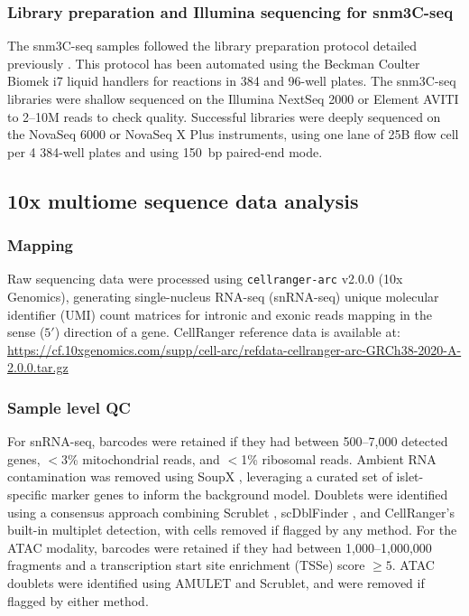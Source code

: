 \subsubsection{Library preparation and Illumina sequencing for snm3C-seq}

The snm3C-seq samples followed the library preparation protocol detailed previously \cite{Lee2019-qo,Liu2021-km}. This protocol has been automated using the Beckman Coulter Biomek i7 liquid handlers for reactions in 384 and 96-well plates. The snm3C-seq libraries were shallow sequenced on the Illumina NextSeq 2000 or Element AVITI to 2--10M reads to check quality. Successful libraries were deeply sequenced on the NovaSeq 6000 or NovaSeq X Plus instruments, using one lane of 25B flow cell per 4 384-well plates and using 150~bp paired-end mode.

\subsection*{10x multiome sequence data analysis}

\subsubsection{Mapping}
Raw sequencing data were processed using \texttt{cellranger-arc} v2.0.0 (10x Genomics), generating single-nucleus RNA-seq (snRNA-seq) unique molecular identifier (UMI) count matrices for intronic and exonic reads mapping in the sense ($5'$) direction of a gene. CellRanger reference data is available at: \url{https://cf.10xgenomics.com/supp/cell-arc/refdata-cellranger-arc-GRCh38-2020-A-2.0.0.tar.gz}

\subsubsection{Sample level QC}
For snRNA-seq, barcodes were retained if they had between 500--7{,}000 detected genes, $<$3\% mitochondrial reads, and $<$1\% ribosomal reads. Ambient RNA contamination was removed using SoupX \cite{Young2020-qv}, leveraging a curated set of islet-specific marker genes to inform the background model. Doublets were identified using a consensus approach combining Scrublet \cite{Wolock2019-hq}, scDblFinder \cite{Germain2021-uf}, and CellRanger's built-in multiplet detection, with cells removed if flagged by any method. For the ATAC modality, barcodes were retained if they had between 1{,}000--1{,}000{,}000 fragments and a transcription start site enrichment (TSSe) score $\geq 5$. ATAC doublets were identified using AMULET \cite{Thibodeau2021-gy} and Scrublet, and were removed if flagged by either method.

